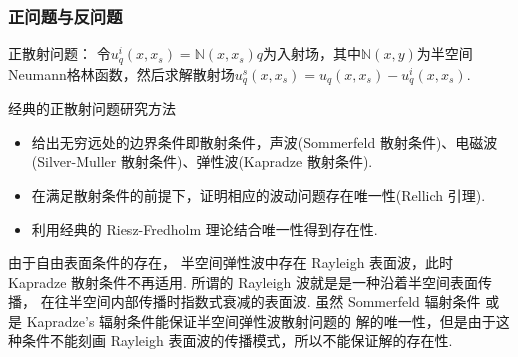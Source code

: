 \documentclass[8pt]{beamer}
\newcommand{\N}{\mathbb{N}}
\begin{document}
\begin{frame}
\frametitle{正问题与反问题}
	\begin{block}{正散射问题：}
		令$u^i_q(x,x_s)=\N(x,x_s)q$为入射场，其中$\N(x,y)$为半空间Neumann格林函数，然后求解散射场$u^s_q(x,x_s)=u_q(x,x_s)-u^i_q(x,x_s)$.
	\end{block}
\pause
   \begin{block}{经典的正散射问题研究方法}
	\begin{itemize}
		\item 给出无穷远处的边界条件即散射条件，声波(Sommerfeld 散射条件)、电磁波(Silver-Muller 散射条件)、弹性波(Kapradze 散射条件).
		\item 在满足散射条件的前提下，证明相应的波动问题存在唯一性(Rellich 引理).
		\item 利用经典的 Riesz-Fredholm 理论结合唯一性得到存在性.
	\end{itemize}
\end{block}
\bigskip
\pause
由于自由表面条件的存在， 半空间弹性波中存在 Rayleigh 表面波，此时 Kapradze 散射条件不再适用.  所谓的 Rayleigh 波就是是一种沿着半空间表面传播， 在往半空间内部传播时指数式衰减的表面波. 虽然 Sommerfeld 辐射条件 或是 Kapradze's 辐射条件能保证半空间弹性波散射问题的 解的唯一性，但是由于这种条件不能刻画 Rayleigh 表面波的传播模式，所以不能保证解的存在性.

\end{frame}
\end{document}
